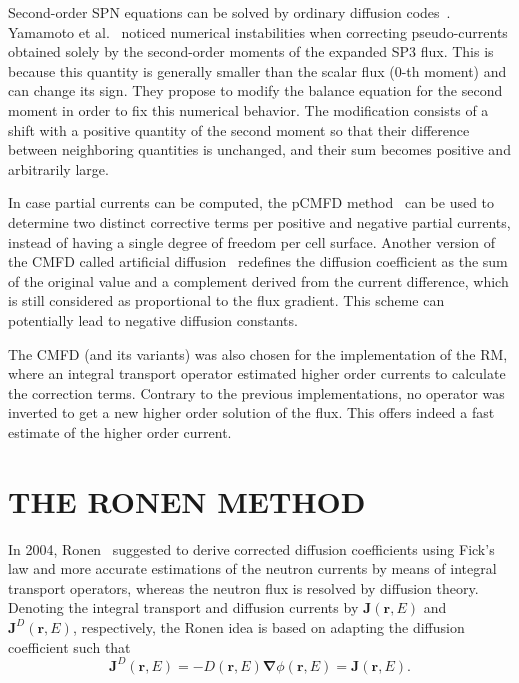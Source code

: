 \documentclass[letterpaper]{physor2020}
\newcommand{\rr}{\ensuremath{\bm{r}}}
\newcommand{\bnabla}{\ensuremath{\bm{\nabla}}}
\newcommand{\rE}{\ensuremath{(\rr,E)}}
\newcommand{\rr}{\ensuremath{\bm{r}}}
\newcommand{\bnabla}{\ensuremath{\bm{\nabla}}}
\newcommand{\rE}{\ensuremath{(\rr,E)}}
\begin{document}
Second-order SPN equations can be solved by ordinary diffusion codes~\cite{Larsen-1993}. Yamamoto et al.~\cite{Yamamoto-2016} noticed numerical instabilities when correcting pseudo-currents obtained solely by the second-order moments of the expanded SP3 flux. This is because this quantity is generally smaller than the scalar flux (0-th moment) and can change its sign. They propose to modify the balance equation for the second moment in order to fix this numerical behavior. The modification consists of a shift with a positive quantity of the second moment so that their difference between neighboring quantities is unchanged, and their sum becomes positive and arbitrarily large.

In case partial currents can be computed, the pCMFD method~\cite{Cho-2003} can be used to determine two distinct corrective terms per positive and negative partial currents, instead of having a single degree of freedom per cell surface. Another version of the CMFD called artificial diffusion~\cite{Zhu-2016,Jarrett-2016} redefines the diffusion coefficient as the sum of the original value and a complement derived from the current difference, which is still considered as proportional to the flux gradient. This scheme can potentially lead to negative diffusion constants.

The CMFD (and its variants) was also chosen for the implementation of the RM, where an integral transport operator estimated higher order currents to calculate the correction terms. Contrary to the previous implementations, no operator was inverted to get a new higher order solution of the flux. This offers indeed a fast estimate of the higher order current.


\section{THE RONEN METHOD}
\label{sec:RM}

In 2004, Ronen~\cite{Ronen-2004} suggested to derive corrected diffusion coefficients using Fick's law and more accurate estimations of the neutron currents by means of integral transport operators, whereas the neutron flux is resolved by diffusion theory. Denoting the integral transport and diffusion currents by $\bm{J}\rE$ and $\bm{J}^D\rE$, respectively, the Ronen idea is based on adapting the diffusion coefficient such that
\begin{equation}\label{eq:Fick}
\bm{J}^D\rE = -D\rE\bnabla\phi\rE = \bm{J}\rE. 
\end{equation}
\end{document}
